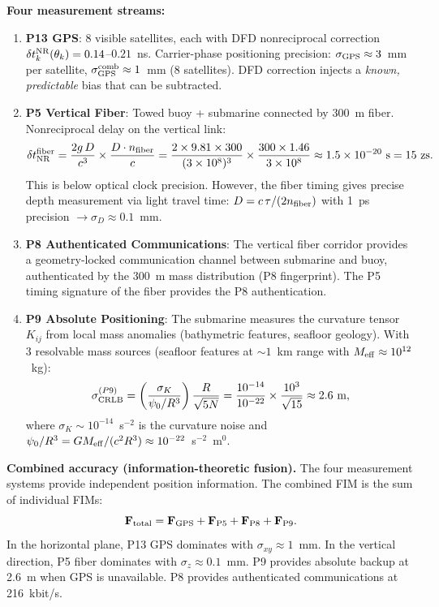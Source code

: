 \documentclass[aps,prd,twocolumn,superscriptaddress,nofootinbib]{revtex4-2}
\begin{document}
\textbf{Four measurement streams:}
\begin{enumerate}
\item \textbf{P13 GPS}: 8 visible satellites, each with DFD nonreciprocal
correction $\delta t_k^{\rm NR}(\theta_k) = 0.14$--$0.21$~ns.  Carrier-phase
positioning precision: $\sigma_{\rm GPS} \approx 3$~mm per satellite,
$\sigma_{\rm GPS}^{\rm comb} \approx 1$~mm (8 satellites).
DFD correction injects a \emph{known, predictable} bias that can be
subtracted.

\item \textbf{P5 Vertical Fiber}: Towed buoy + submarine connected by
300~m fiber.  Nonreciprocal delay on the vertical link:
\begin{equation}
\delta t_{\rm NR}^{\rm fiber} = \frac{2g\,D}{c^3}\times\frac{D\cdot n_{\rm fiber}}{c}
= \frac{2\times 9.81\times 300}{(3\times 10^8)^3}\times\frac{300\times 1.46}{3\times 10^8}
\approx 1.5\times 10^{-20}~\text{s} = 15~\text{zs}.
\end{equation}
This is below optical clock precision.  However, the fiber timing gives
precise depth measurement via light travel time: $D = c\,\tau/(2n_{\rm fiber})$
with 1~ps precision $\to \sigma_D \approx 0.1$~mm.

\item \textbf{P8 Authenticated Communications}: The vertical fiber corridor
provides a geometry-locked communication channel between submarine and buoy,
authenticated by the 300~m mass distribution (P8 fingerprint).  The P5
timing signature of the fiber provides the P8 authentication.

\item \textbf{P9 Absolute Positioning}: The submarine measures the
curvature tensor $K_{ij}$ from local mass anomalies (bathymetric features,
seafloor geology).  With 3 resolvable mass sources (seafloor features
at $\sim 1$~km range with $M_{\rm eff} \approx 10^{12}$~kg):
\begin{equation}
\sigma_{\rm CRLB}^{(P9)} = \left(\frac{\sigma_K}{\psi_0/R^3}\right)\frac{R}{\sqrt{5N}}
= \frac{10^{-14}}{10^{-22}} \times \frac{10^3}{\sqrt{15}}
\approx 2.6~\text{m},
\end{equation}
where $\sigma_K \sim 10^{-14}$~s$^{-2}$ is the curvature noise and
$\psi_0/R^3 = GM_{\rm eff}/(c^2 R^3) \approx 10^{-22}$~s$^{-2}$~m$^0$.
\end{enumerate}

\textbf{Combined accuracy (information-theoretic fusion).}
The four measurement systems provide independent position information.
The combined FIM is the sum of individual FIMs:
\begin{equation}
\mathbf{F}_{\rm total} = \mathbf{F}_{\rm GPS} + \mathbf{F}_{\rm P5}
+ \mathbf{F}_{\rm P8} + \mathbf{F}_{\rm P9}.
\end{equation}
In the horizontal plane, P13 GPS dominates with $\sigma_{xy} \approx 1$~mm.
In the vertical direction, P5 fiber dominates with $\sigma_z \approx 0.1$~mm.
P9 provides absolute backup at 2.6~m when GPS is unavailable.
P8 provides authenticated communications at 216~kbit/s.
\end{document}
